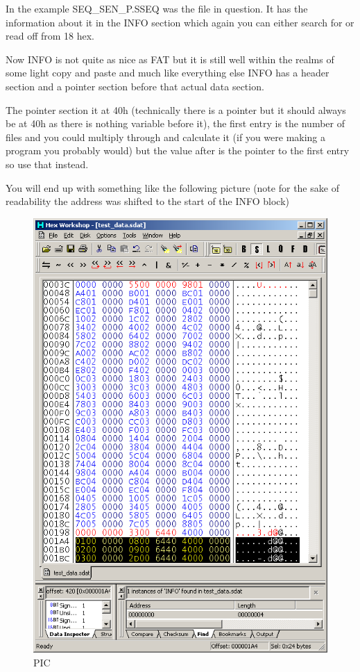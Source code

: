 \documentclass[
]{book}
\begin{document}
In the example SEQ\_SEN\_P.SSEQ was the file in question. It has the information about it in the INFO section which again you can either search for or read off from 18 hex.

Now INFO is not quite as nice as FAT but it is still well within the realms of some light copy and paste and much like everything else INFO has a header section and a pointer section before that actual data section.

The pointer section it at 40h (technically there is a pointer but it should always be at 40h as there is nothing variable before it), the first entry is the number of files and you could multiply through and calculate it (if you were making a program you probably would) but the value after is the pointer to the first entry so use that instead.

You will end up with something like the following picture (note for the sake of readability the address was shifted to the start of the INFO block)

\begin{figure}
\centering
\includegraphics{images/142_home_fast6191_romhackingguide_unrenamed_files_and_original_borders_relinkinghexworkshop3.png}
\caption{PIC}
\end{figure}
\end{document}
